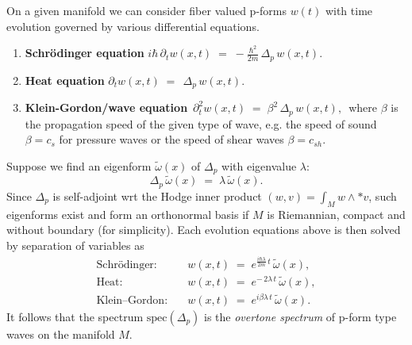 \documentclass[../geometry_main.tex]{subfiles}
\begin{document}
\begin{mytheorem}
%
On a given manifold we can consider fiber valued p-forms \(w(t)\) with time evolution governed by various differential equations.
%
\begin{enumerate}
\item \textbf{Schrödinger equation }
\(
 i\hbar\,\partial_t w(x,t)
 \;=\; -\frac{\hbar^2}{2m}\,\Delta_p\,w(x,t).
\)
\item \textbf{Heat equation }
\(
 \partial_t w(x,t)
 \;=\; \,\Delta_p\,w(x,t).
\)
\item \textbf{Klein-Gordon/wave equation}
\(
 \,\partial_t^2 w(x,t)
 \;=\; \beta^2\,\Delta_p\,w(x,t),\,
\)
where \(\beta\) is the propagation speed of the given type of wave, e.g. the speed of sound $\beta=c_s$ for pressure waves or the speed of shear waves $ \beta=c_{sh}$.
%
\end{enumerate}
%
Suppose we find an eigenform \(\tilde{\omega}(x)\) of \(\Delta_p\) with eigenvalue \(\lambda\):
\[
 \Delta_p\,\tilde{\omega}(x) \;=\; \lambda\,\tilde{\omega}(x).
\]
Since \(\Delta_p\) is self-adjoint wrt the Hodge inner product \((w,v)=\int_M w\wedge *v\), such eigenforms exist and form an orthonormal basis if $M$ is Riemannian, compact and without boundary (for simplicity).
%
Each evolution equations above is then solved by separation of variables as 
\begin{align*}
 \text{Schrödinger:}&\quad
 w(x,t) \;=\; e^{\tfrac{i\hbar\lambda}{2m}\,t}\,\tilde{\omega}(x),\\[0.3em]
 \text{Heat:}&\quad
 w(x,t) \;=\; e^{-\,2\lambda\,t}\,\tilde{\omega}(x),\\[0.3em]
 \text{Klein–Gordon:}&\quad
 w(x,t) \;=\; e^{i\beta\lambda\,t}\,\tilde{\omega}(x).
\end{align*}
%
It follows that the spectrum \(\mathrm{spec}(\Delta_p)\) is the \emph{overtone spectrum} of p-form type waves on the manifold \(M\).
%
\end{mytheorem}
\end{document}
